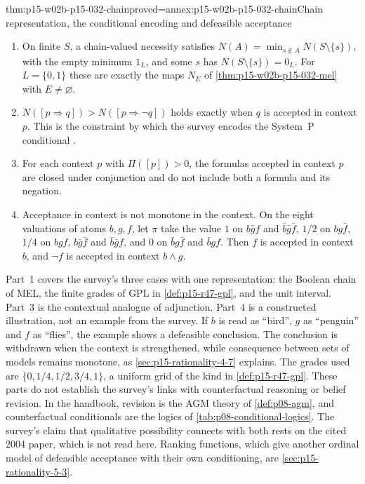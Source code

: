 \begin{hbtheorem}{thm:p15-w02b-p15-032-chain}{proved=annex:p15-w02b-p15-032-chain}{Chain representation, the conditional encoding and defeasible acceptance}
\begin{enumerate}
\item On finite \(S\), a chain-valued necessity satisfies
  \(N(A)=\min_{s\notin A}N(S\setminus\{s\})\), with the empty minimum
  \(1_L\), and some \(s\) has \(N(S\setminus\{s\})=0_L\). For
  \(L=\{0,1\}\) these are exactly the maps \(N_E\) of
  \cref{thm:p15-w02b-p15-032-mel} with \(E\neq\varnothing\).
\item \(N([p\Rightarrow q])>N([p\Rightarrow\neg q])\) holds exactly when \(q\)
  is accepted in context \(p\). This is the constraint by which the survey
  encodes the System~P conditional \cite[p.~310]{DuboisPrade2021RepresentingBelief}.
\item For each context \(p\) with \(\Pi([p])>0\), the formulas accepted in
  context \(p\) are closed under conjunction and do not include both a
  formula and its negation.
\item Acceptance in context is not monotone in the context. On the eight
  valuations of atoms \(b,g,f\), let \(\pi\) take the value \(1\) on
  \(b\bar gf\) and \(\bar b\bar g\bar f\), \(1/2\) on \(bg\bar f\), \(1/4\)
  on \(bgf\), \(b\bar g\bar f\) and \(\bar b\bar gf\), and \(0\) on
  \(\bar bg\bar f\) and \(\bar bgf\). Then \(f\) is accepted in context
  \(b\), and \(\neg f\) is accepted in context \(b\land g\).
\end{enumerate}
\end{hbtheorem}

Part~1 covers the survey's three cases with one representation: the
Boolean chain of MEL, the finite grades of GPL in \cref{def:p15-r47-gpl},
and the unit interval. Part~3 is the contextual analogue of adjunction.
Part~4 is a constructed illustration, not an example from the survey. If
\(b\) is read as ``bird'', \(g\) as ``penguin'' and \(f\) as ``flies'', the
example shows a defeasible conclusion. The conclusion is withdrawn when
the context is strengthened, while consequence between sets of models
remains monotone, as \cref{sec:p15-rationality-4-7} explains.
The grades used are \(\{0,1/4,1/2,3/4,1\}\), a uniform grid of the kind in
\cref{def:p15-r47-gpl}. These parts do not establish the survey's links with
counterfactual reasoning or belief revision. In the handbook, revision is
the AGM theory of \cref{def:p08-agm}, and counterfactual conditionals are
the logics of \cref{tab:p08-conditional-logics}. The survey's claim that
qualitative possibility connects with both rests on the cited 2004 paper,
which is not read here. Ranking functions, which give another ordinal
model of defeasible acceptance with their own conditioning, are
\cref{sec:p15-rationality-5-3}.

